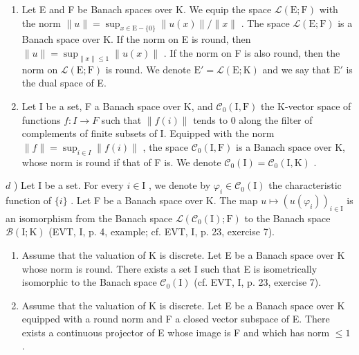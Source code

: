 \begin{enumerate}
\def\labelenumi{\alph{enumi})}
\setcounter{enumi}{1}
\item
  Let E and F be Banach spaces over K. We equip the space \(\mathcal{L}(\mathrm{E};\mathrm{F})\) with the norm \(\| u\| = \sup_{x\in \mathrm{E}- \{0\}}\| u(x)\| /\| x\|\) . The space \(\mathcal{L}(\mathrm{E};\mathrm{F})\) is a Banach space over K. If the norm on E is round, then \(\| u\| = \sup_{\| x\| \leqslant 1}\| u(x)\|\) . If the norm on F is also round, then the norm on \(\mathcal{L}(\mathrm{E};\mathrm{F})\) is round. We denote \(\mathrm{E}' = \mathcal{L}(\mathrm{E};\mathrm{K})\) and we say that \(\mathrm{E}'\) is the dual space of E.
\item
  Let I be a set, F a Banach space over K, and \(\mathcal{C}_{0}(\mathrm{I},\mathrm{F})\) the K-vector space of functions \(f\colon I\to F\) such that \(\|f(i)\|\) tends to 0 along the filter of complements of finite subsets of I. Equipped with the norm \(\|f\|=\sup_{i\in I}\|f(i)\|\) , the space \(\mathcal{C}_{0}(\mathrm{I},\mathrm{F})\) is a Banach space over K, whose norm is round if that of F is. We denote \(\mathcal{C}_{0}(\mathrm{I})=\mathcal{C}_{0}(\mathrm{I},\mathrm{K})\) .
\end{enumerate}

\(d\) ) Let I be a set. For every \(i\in \mathrm{I}\) , we denote by \(\varphi_{i}\in \mathcal{C}_{0}(\mathrm{I})\) the characteristic function of \(\{i\}\) . Let F be a Banach space over K. The map \(u \mapsto (u(\varphi_i))_{i \in \mathrm{I}}\) is an isomorphism from the Banach space \(\mathcal{L}(\mathcal{C}_0(\mathrm{I});\mathrm{F})\) to the Banach space \(\mathcal{B}(\mathrm{I};\mathrm{K})\) (EVT, I, p. 4, example; cf. EVT, I, p. 23, exercise 7).

\begin{enumerate}
\def\labelenumi{\alph{enumi})}
\setcounter{enumi}{4}
\item
  Assume that the valuation of K is discrete. Let E be a Banach space over K whose norm is round. There exists a set I such that E is isometrically isomorphic to the Banach space \(\mathcal{C}_{0}(\mathrm{I})\) (cf. EVT, I, p. 23, exercise 7).
\item
  Assume that the valuation of K is discrete. Let E be a Banach space over K equipped with a round norm and F a closed vector subspace of E. There exists a continuous projector of E whose image is F and which has norm \(\leqslant 1\) .
\end{enumerate}

